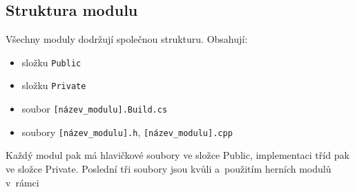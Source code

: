 \subsection{Struktura modulu}
Všechny moduly dodržují společnou strukturu. Obsahují:
\begin{itemize}
	\item složku \verb!Public!
	\item složku \verb!Private!
	\item soubor \verb![název_modulu].Build.cs!
	\item soubory \verb![název_modulu].h!, \verb![název_modulu].cpp!
\end{itemize}


Každý modul pak má hlavičkové soubory ve složce Public, implementaci tříd pak ve složce Private. Poslední tři soubory jsou kvůli \UBT{} a~použitím herních modulů v~rámci \UE{}












